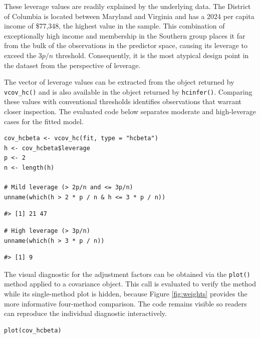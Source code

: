 These leverage values are readily explained by the underlying data. The District of Columbia is located between Maryland and Virginia and has a 2024 per capita income of \$77,348, the highest value in the sample. This combination of exceptionally high income and membership in the Southern group places it far from the bulk of the observations in the predictor space, causing its leverage to exceed the \(3p/n\) threshold. Consequently, it is the most atypical design point in the dataset from the perspective of leverage.

The vector of leverage values can be extracted from the object returned by \texttt{vcov\_hc()} and is also available in the object returned by \texttt{hcinfer()}. Comparing these values with conventional thresholds identifies observations that warrant closer inspection. The evaluated code below separates moderate and high-leverage cases for the fitted model.

\begin{verbatim}
cov_hcbeta <- vcov_hc(fit, type = "hcbeta")
h <- cov_hcbeta$leverage
p <- 2
n <- length(h)

# Mild leverage (> 2p/n and <= 3p/n)
unname(which(h > 2 * p / n & h <= 3 * p / n))
\end{verbatim}

\begin{verbatim}
#> [1] 21 47
\end{verbatim}

\begin{verbatim}
# High leverage (> 3p/n)
unname(which(h > 3 * p / n))
\end{verbatim}

\begin{verbatim}
#> [1] 9
\end{verbatim}

The visual diagnostic for the adjustment factors can be obtained via the \texttt{plot()} method applied to a covariance object. This call is evaluated to verify the method while its single-method plot is hidden, because Figure \ref{fig:weights} provides the more informative four-method comparison. The code remains visible so readers can reproduce the individual diagnostic interactively.

\begin{verbatim}
plot(cov_hcbeta)
\end{verbatim}

